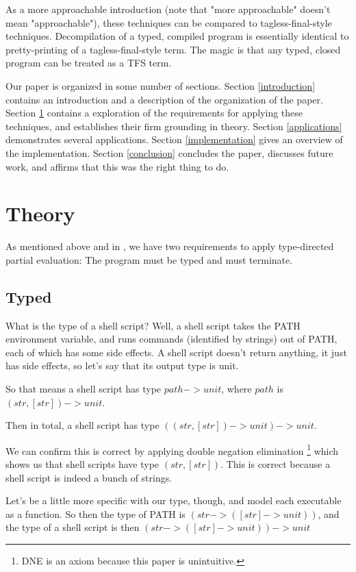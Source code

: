 \documentclass[sigplan]{acmart}
\begin{document}
As a more approachable introduction (note that "more approachable" doesn't mean "approachable"),
these techniques can be compared to tagless-final-style techniques.
Decompilation of a typed, compiled program is essentially identical to pretty-printing of a tagless-final-style term.
The magic is that any typed, closed program can be treated as a TFS term.

Our paper is organized in some number of sections.
Section \ref{introduction} contains an introduction and a description of the organization of the paper.
Section \ref{theory} contains a exploration of the requirements for applying these techniques,
and establishes their firm grounding in theory.
Section \ref{applications} demonstrates several applications.
Section \ref{implementation} gives an overview of the implementation.
Section \ref{conclusion} concludes the paper, discusses future work, and affirms that this was the right thing to do.
\section{Theory}\label{theory}

As mentioned above and in \cite{danvy},
we have two requirements to apply type-directed partial evaluation:
The program must be typed and must terminate.
\subsection{Typed}
What is the type of a shell script?
Well, a shell script takes the PATH environment variable,
and runs commands (identified by strings) out of PATH,
each of which has some side effects.
A shell script doesn't return anything, it just has side effects,
so let's say that its output type is unit.

So that means a shell script has type $path -> unit$,
where $path$ is $(str, [str]) -> unit$.

Then in total, a shell script has type $((str, [str]) -> unit) -> unit$.

We can confirm this is correct by applying double negation elimination
\footnote{DNE is an axiom because this paper is unintuitive.}
which shows us that shell scripts have type $(str, [str])$.
This is correct because a shell script is indeed a bunch of strings.

Let's be a little more specific with our type, though, and model each executable as a function.
So then the type of PATH is $(str -> ([str] -> unit))$,
and the type of a shell script is then $(str -> ([str] -> unit)) -> unit$
\end{document}
